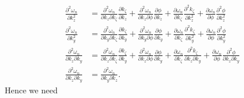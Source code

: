 \documentclass{article}
\begin{document}
\begin{align}
\frac{\partial^2 \omega_{n}}{\partial k_{z}^2} &= \frac{\partial^2 \omega_{n}}{\partial k_{z} \partial k_{\zeta}} \frac{\partial k_{\zeta}}{\partial k_{z}} + \frac{\partial^2 \omega_{n}}{\partial k_{z} \partial \phi} \frac{\partial \phi}{\partial k_{z}} + \frac{\partial \omega_{n}}{\partial k_{\zeta}} \frac{\partial^2 k_{\zeta}}{\partial k_{z}^2} + \frac{\partial \omega_{n}}{\partial \phi} \frac{\partial^2 \phi}{\partial k_{z}^2} \\
\frac{\partial^2 \omega_{n}}{\partial k_{y}^2} &= \frac{\partial^2 \omega_{n}}{\partial k_{y} \partial k_{\zeta}} \frac{\partial k_{\zeta}}{\partial k_{y}} + \frac{\partial^2 \omega_{n}}{\partial k_{y} \partial \phi} \frac{\partial \phi}{\partial k_{y}} + \frac{\partial \omega_{n}}{\partial k_{\zeta}} \frac{\partial^2 k_{\zeta}}{\partial k_{y}^2} + \frac{\partial \omega_{n}}{\partial \phi} \frac{\partial^2 \phi}{\partial k_{y}^2} \\
\frac{\partial^2 \omega_{n}}{\partial k_{z} \partial k_{y}} &= \frac{\partial^2 \omega_{n}}{\partial k_{z} \partial k_{\zeta}} \frac{\partial k_{\zeta}}{\partial k_{y}} + \frac{\partial^2 \omega_{n}}{\partial k_{z} \partial \phi} \frac{\partial \phi}{\partial k_{y}} + \frac{\partial \omega_{n}}{\partial k_{\zeta}} \frac{\partial^2 k_{\zeta}}{\partial k_{z} \partial k_{y}} + \frac{\partial \omega_{n}}{\partial \phi} \frac{\partial^2 \phi}{\partial k_{z} \partial k_{y}} \\
\frac{\partial^2 \omega_{n}}{\partial k_{z} \partial k_{y}} &= \frac{\partial^2 \omega_{n}}{\partial k_{y} \partial k_{z}}.
\end{align}
Hence we need
\end{document}
